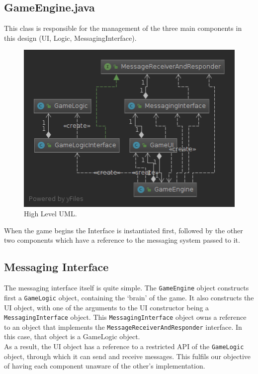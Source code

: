 \documentclass[a4paper, 11pt]{article}
\begin{document}
	\subsection*{GameEngine.java}
	This class is responsible for the management of the three main components in this design (UI, Logic, MessagingInterface). 
	\begin{figure}[!h]
		\centering
		\includegraphics[scale=.45]{uml/messaging_system_uml}
		\caption{High Level UML.}
		\label{fig:high_level_uml}
	\end{figure}
	When the game begins the Interface is instantiated first, followed by the other two components which have a reference to the messaging system passed to it.
		
	\subsection*{Messaging Interface}
	The messaging interface itself is quite simple. The \texttt{GameEngine} object constructs first a \texttt{GameLogic} object, containing the `brain' of the game. It also constructs the UI object, with one of the arguments to the UI constructor being a \texttt{MessagingInterface} object. This \texttt{MessagingInterface} object owns a reference to an object that implements the \texttt{MessageReceiverAndResponder} interface. In this case, that object is a GameLogic object.\\	
	As a result, the UI object has a reference to a restricted API of the \texttt{GameLogic} object, through which it can send and receive messages. This fulfils our objective of having each component unaware of the other's implementation.\\	
\end{document}
